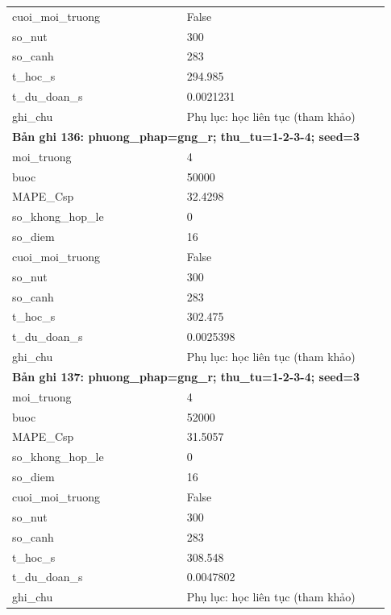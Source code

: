 \begin{longtable}{p{0.43\linewidth}p{0.50\linewidth}}
cuoi\_\allowbreak moi\_\allowbreak truong & False \\
so\_\allowbreak nut & 300 \\
so\_\allowbreak canh & 283 \\
t\_\allowbreak hoc\_\allowbreak s & 294.985 \\
t\_\allowbreak du\_\allowbreak doan\_\allowbreak s & 0.0021231 \\
ghi\_\allowbreak chu & Phụ lục: học liên tục (tham khảo) \\
\midrule
\multicolumn{2}{p{0.95\linewidth}}{\textbf{Bản ghi 136: phuong\_phap=gng\_r; thu\_tu=1-2-3-4; seed=3}} \\
moi\_\allowbreak truong & 4 \\
buoc & 50000 \\
MAPE\_\allowbreak Csp & 32.4298 \\
so\_\allowbreak khong\_\allowbreak hop\_\allowbreak le & 0 \\
so\_\allowbreak diem & 16 \\
cuoi\_\allowbreak moi\_\allowbreak truong & False \\
so\_\allowbreak nut & 300 \\
so\_\allowbreak canh & 283 \\
t\_\allowbreak hoc\_\allowbreak s & 302.475 \\
t\_\allowbreak du\_\allowbreak doan\_\allowbreak s & 0.0025398 \\
ghi\_\allowbreak chu & Phụ lục: học liên tục (tham khảo) \\
\midrule
\multicolumn{2}{p{0.95\linewidth}}{\textbf{Bản ghi 137: phuong\_phap=gng\_r; thu\_tu=1-2-3-4; seed=3}} \\
moi\_\allowbreak truong & 4 \\
buoc & 52000 \\
MAPE\_\allowbreak Csp & 31.5057 \\
so\_\allowbreak khong\_\allowbreak hop\_\allowbreak le & 0 \\
so\_\allowbreak diem & 16 \\
cuoi\_\allowbreak moi\_\allowbreak truong & False \\
so\_\allowbreak nut & 300 \\
so\_\allowbreak canh & 283 \\
t\_\allowbreak hoc\_\allowbreak s & 308.548 \\
t\_\allowbreak du\_\allowbreak doan\_\allowbreak s & 0.0047802 \\
ghi\_\allowbreak chu & Phụ lục: học liên tục (tham khảo) \\

\end{longtable}
